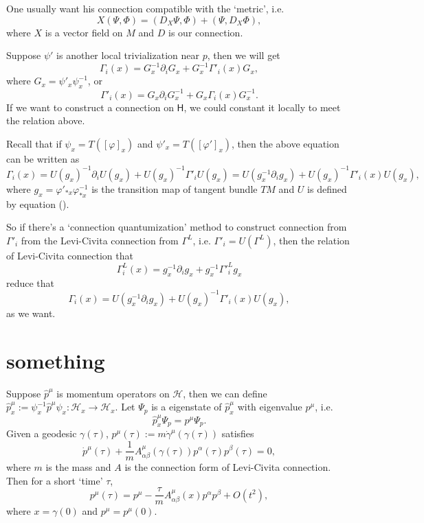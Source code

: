 \documentclass[12pt]{article}
\theoremstyle{definition}
\theoremstyle{plain}
\begin{document}
One usually want his connection compatible with the `metric', i.e.
\[
	X(\Psi,\Phi)=(D_X\Psi,\Phi)+(\Psi,D_X\Phi),
\]
where $X$ is a vector field on $M$ and $D$ is our connection.

Suppose $\psi'$ is another local trivialization near $p$, then we will get
\[
	\Gamma_i(x)=G_x^{-1}\partial_i G_x+G^{-1}_x\Gamma'_i(x)G_x,
\]
where $G_x=\psi'_x\psi^{-1}_x$, or 
\[
	\Gamma'_i(x)=G_x\partial_i G_x^{-1}+G_x\Gamma_i(x)G_x^{-1}.
\]
If we want to construct a connection on $\mathsf H$, we could constant it locally to meet the relation above.

Recall that if $\psi_x=T([\varphi]_x)$ and $\psi'_x=T([\varphi']_x)$, then the above equation can be written as
\[
	\Gamma_i(x)=U(g_x)^{-1}\partial_iU(g_x)+U(g_x)^{-1}\Gamma'_iU(g_x)=U(g_x^{-1}\partial_ig_x)+U(g_x)^{-1}\Gamma'_i(x)U(g_x),
\]
where $g_x=\varphi'_{*x}\varphi_{*x}^{-1}$ is the transition map of tangent bundle $TM$ and $U$ is defined by equation (\theequation).

So if there's a `connection quantumization' method to construct connection from $\Gamma'_i$ from the Levi-Civita connection from $\Gamma^L$, i.e. $\Gamma'_i=U(\Gamma^L)$, then the relation of Levi-Civita connection that
\[
	\Gamma^L_i(x)=g_x^{-1}\partial_ig_x+g_x^{-1}{\Gamma'}^L_ig_x
\]
reduce that
\[
	\Gamma_i(x)=U(g_x^{-1}\partial_ig_x)+U(g_x)^{-1}\Gamma'_i(x)U(g_x),
\]
as we want.

\section{something}

Suppose $\hat p^\mu$ is momentum operators on $\mathcal H$, then we can define $\hat p^\mu_x:=\psi_x^{-1}\hat p^\mu\psi_x:\mathcal H_x\to \mathcal H_x$. Let $\Psi_{p}$ is a eigenstate of $\hat p^\mu_x$ with eigenvalue $p^\mu$, i.e.
\[
	\hat p^\mu_x\Psi_{p}=p^\mu\Psi_{p}.
\]
Given a geodesic $\gamma(\tau)$, $p^\mu(\tau):=m\dot\gamma^\mu(\gamma(\tau))$ satisfies
\[
	\dot p^\mu(\tau)+\frac{1}{m}A^\mu_{\alpha\beta}(\gamma(\tau))p^\alpha(\tau)p^\beta(\tau)=0,
\]
where $m$ is the mass and $A$ is the connection form of Levi-Civita connection. Then for a short `time' $\tau$,
\[
	p^\mu(\tau)=p^\mu-\frac{\tau}{m}A^\mu_{\alpha\beta}(x)p^\alpha p^\beta +O(t^2),
\]
where $x=\gamma(0)$ and $p^\mu=p^\mu(0)$.
\end{document}
